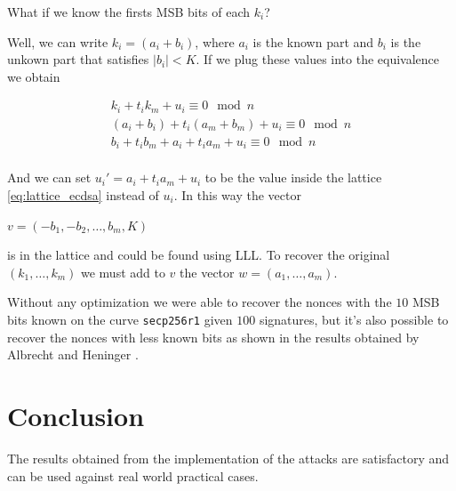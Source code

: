 \documentclass[a4paper,12pt]{report}
\begin{document}
What if we know the firsts MSB bits of each $k_i$?

Well, we can write $k_i = (a_i + b_i)$, where $a_i$ is the known part and $b_i$ is the unkown part that satisfies $|b_i| < K$. If we plug these values
into the equivalence we obtain

\[
    \begin{array}{c}
        k_i + t_ik_m + u_i \equiv 0 \mod n \\
        (a_i + b_i) + t_i(a_m + b_m) + u_i \equiv 0 \mod n \\
        b_i + t_ib_m + a_i + t_ia_m + u_i \equiv 0 \mod n \\
    \end{array}
\]

And we can set $u_i' = a_i + t_ia_m + u_i$ to be the value inside the lattice \ref{eq:lattice_ecdsa} instead of $u_i$. In this way the vector

\begin{center}
    $v = (-b_1, -b_2, \ldots, b_m, K)$
\end{center}

is in the lattice and could be found using LLL. To recover the original $(k_1, \ldots, k_m)$ we must add to $v$ the vector $w = (a_1, \ldots, a_m)$.

Without any optimization we were able to recover the nonces with the $10$ MSB bits known on the curve \texttt{secp256r1} given $100$ signatures,
but it's also possible to recover the nonces with less known bits as shown in the results obtained by Albrecht and Heninger \cite{ecdsa_result}.

\chapter*{Conclusion}

The results obtained from the implementation of the attacks are satisfactory and can be used against real world practical cases.




\end{document}
